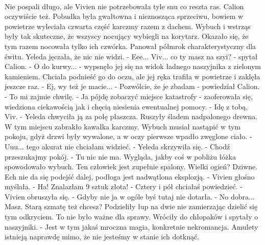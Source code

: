 \documentclass[10pt,twoside,twocolumn]{book}
\begin{document}
\paragraph{}
Nie pospali długo, ale Vivien nie potrzebowała tyle snu co reszta ras. Calion oczywiście też. Pobudka była gwałtowna i nieznosząca sprzeciwu, bowiem w powietrze wyleciała czwarta część karczmy razem z dachem. Wybuch i wstrząs były tak skuteczne, że wszyscy nocujący wybiegli na korytarz. Okazało się, że tym razem nocowała tylko ich czwórka. Panował półmrok charakterystyczny dla świtu. Yeleda jęczała, że nic nie widzi.\newline
\indent - Eee... Viv... co ty masz na szyi? - spytał Calion.\newline
\indent - O do kurwy... - wypsnęło jej się na widok ładnego naszyjnika z zielonym kamieniem. Chciała podnieść go do oczu, ale jej ręka trafiła w powietrze i zaklęła jeszcze raz. - Ej, wy też je macie...\newline
\indent - Pozwólcie, że je zbadam - powiedział Calion. - To mi zajmie chwilę.\newline
\indent - Ja pójdę zobaczyć miejsce katastrofy - zaoferowała się, wiedziona ciekawością jak i chęcią niesienia ewentualnej pomocy.\newline
\indent - Idę z tobą, Viv. - Yeleda chwyciła ją za połę płaszcza. Ruszyły śladem nadpalonego drewna. W tym miejscu zabrakło kawałka karczmy. Wybuch musiał nastąpić w tym pokoju, gdyż drzwi były wywalone, a w oczy pierwsze wpadło zwęglone ciało.\newline
\indent - Uuu... tego akurat nie chciałam widzieć. - Yeleda skrzywiła się. - Chodź przeszukajmy pokój.\newline
\indent - Tu nic nie ma. Wygląda, jakby coś w pobliżu łóżka spowodowało wybuch. Ten człowiek jest zupełnie spalony. Wielki ogień? Dziwne. Ech nie da się podejść dalej, podłoga jest nadwątlona eksplozją. - Vivien głośno myślała.\newline
\indent - Ha! Znalazłam 9 sztuk złota!\newline
\indent - Cztery i pół chciałaś powiedzieć. - Vivien obruszyła się. - Gdyby nie ja w ogóle byś tutaj nie dotarła.\newline
\indent - No dobra... Masz. Starą szmatę też chcesz?\newline
Podzieliły łup na dwie nie zamierzając dzielić się tym odkryciem. To nie było ważne dla sprawy. Wróciły do chłopaków i spytały o naszyjniki.\newline
\indent - Jest w tym jakaś mroczna magia, konkretnie nekromancja. Amulety istnieją naprawdę mimo, że nie jesteśmy w stanie ich dotknąć.\newline
\end{document}
